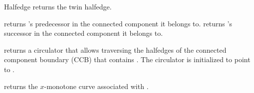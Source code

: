 \begin{ccRefClass}{Halfedge}
    {returns the twin halfedge.}

    {returns \ccVar{}'s predecessor in the connected component it belongs to.}
\ccGlue
{}
    {returns \ccVar{}'s successor in the connected component it belongs to.}

    {returns a circulator that allows traversing the halfedges of the
     connected component boundary (CCB) that contains \ccVar{}.
     The circulator is initialized to point to \ccVar{}.}

    {returns the $x$-monotone curve associated with \ccVar{}.}

\end{ccRefClass}

\ccRefPageEnd
